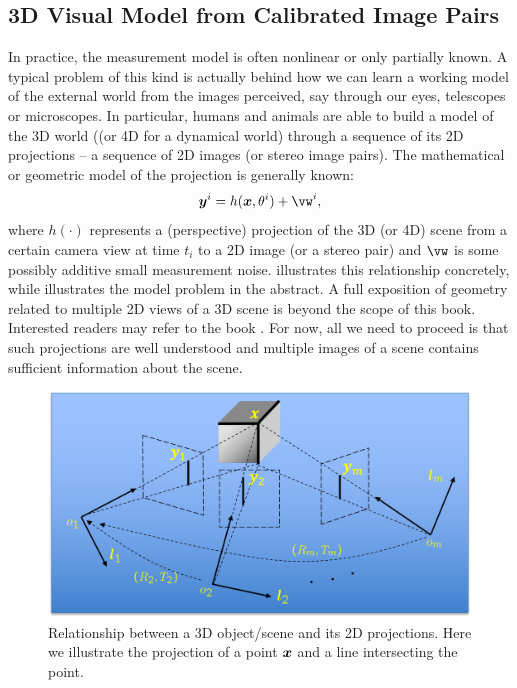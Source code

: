 \documentclass[../../book-main.tex]{subfiles}
\begin{document}
\subsection{3D Visual Model from Calibrated Image Pairs}
In practice, the measurement model is often nonlinear or only partially known. A typical problem of this kind is actually behind how we can learn a working model of the external world from the  images perceived, say through our eyes,  telescopes or microscopes. In particular, humans and animals are able to build a model of the 3D world ((or 4D for a dynamical world) through a sequence of its 2D projections -- a sequence of 2D images (or stereo image pairs). The mathematical or geometric model of the projection is generally known:
\begin{equation}
    \y^i = h(\x, \theta^i) +\vw^{i}, 
\end{equation}
where $h(\cdot)$ represents a  (perspective) projection of the 3D (or 4D) scene from a certain camera view at time $t_i$ to a 2D image (or a stereo pair) and $\vw$ is some possibly additive small measurement noise.  illustrates this relationship concretely, while  illustrates the model problem in the abstract. A full exposition of geometry related to multiple 2D views of a 3D scene is beyond the scope of this book. Interested readers may refer to the book \cite{MaY2003}. For now, all we need to proceed is that such projections are well understood and multiple images of a scene contains sufficient information about the scene.
\begin{figure}[t]
    \centering
    \includegraphics[width=0.7\linewidth]{figs_chap6/3D-2D-projection.png}
    \caption{Relationship between a 3D object/scene and its 2D projections. Here we illustrate the projection of a point $\bm{x}$ and a line intersecting the point.}
    \label{fig:projection-2D}
\end{figure}
\end{document}
